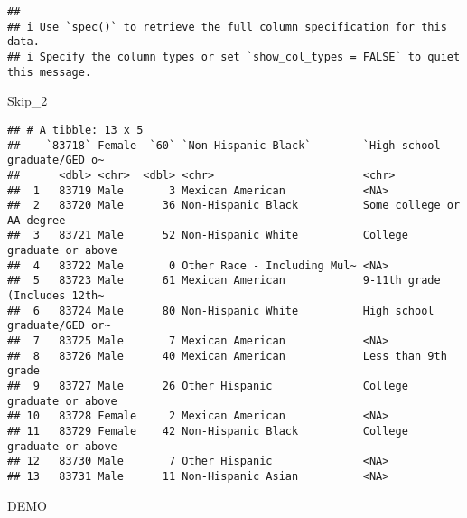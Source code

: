 \documentclass[
]{book}
\newenvironment{Shaded}{\begin{snugshade}}{\end{snugshade}}
\newcommand{\NormalTok}[1]{#1}
\begin{document}
\begin{verbatim}
##
## i Use `spec()` to retrieve the full column specification for this data.
## i Specify the column types or set `show_col_types = FALSE` to quiet this message.
\end{verbatim}

\begin{Shaded}
\begin{Highlighting}[]
\NormalTok{Skip\_2}
\end{Highlighting}
\end{Shaded}

\begin{verbatim}
## # A tibble: 13 x 5
##    `83718` Female  `60` `Non-Hispanic Black`        `High school graduate/GED o~
##      <dbl> <chr>  <dbl> <chr>                       <chr>
##  1   83719 Male       3 Mexican American            <NA>
##  2   83720 Male      36 Non-Hispanic Black          Some college or AA degree
##  3   83721 Male      52 Non-Hispanic White          College graduate or above
##  4   83722 Male       0 Other Race - Including Mul~ <NA>
##  5   83723 Male      61 Mexican American            9-11th grade (Includes 12th~
##  6   83724 Male      80 Non-Hispanic White          High school graduate/GED or~
##  7   83725 Male       7 Mexican American            <NA>
##  8   83726 Male      40 Mexican American            Less than 9th grade
##  9   83727 Male      26 Other Hispanic              College graduate or above
## 10   83728 Female     2 Mexican American            <NA>
## 11   83729 Female    42 Non-Hispanic Black          College graduate or above
## 12   83730 Male       7 Other Hispanic              <NA>
## 13   83731 Male      11 Non-Hispanic Asian          <NA>
\end{verbatim}

\begin{Shaded}
\begin{Highlighting}[]
\NormalTok{DEMO}
\end{Highlighting}
\end{Shaded}
\end{document}
